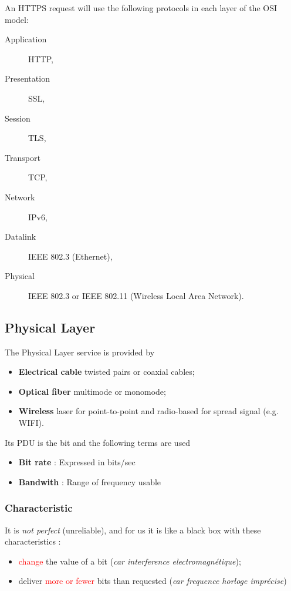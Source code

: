 \begin{myexem}
  An HTTPS request will use the following protocols in each layer of the OSI model:
  \begin{description}
    \item[Application] HTTP,
    \item[Presentation] SSL,
    \item[Session] TLS,
    \item[Transport] TCP,
    \item[Network] IPv6,
    \item[Datalink] IEEE 802.3 (Ethernet),
    \item[Physical] IEEE 802.3 or IEEE 802.11 (Wireless Local Area Network).
  \end{description}
\end{myexem}

\subsection{Physical Layer}
The Physical Layer service is provided by
\begin{itemize}
  \item \textbf{Electrical cable} twisted pairs or coaxial cables;
  \item \textbf{Optical fiber} multimode or monomode;
  \item \textbf{Wireless} laser for point-to-point and radio-based for spread signal (e.g. WIFI).
\end{itemize}
Its PDU is the bit and the following terms are used
\begin{itemize}
    \item \textbf{Bit rate} : Expressed in bits/sec
    \item \textbf{Bandwith} : Range of frequency usable
\end{itemize}

\subsubsection{Characteristic}

It is \textit{not perfect} (unreliable),
and for us it is like a black box with these characteristics :
\begin{itemize}
    \item \textcolor{red}{change} the value of a bit (\textit{car interference electromagnétique});
    \item deliver \textcolor{red}{more or fewer} bits than requested (\textit{car frequence horloge imprécise})
\end{itemize}

